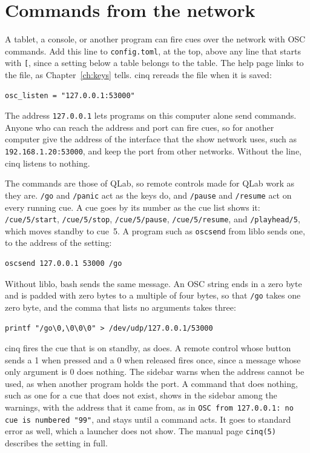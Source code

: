 \section{Commands from the network}

A tablet, a console, or another program can fire cues over the network with
OSC commands.  Add this line to \texttt{config.toml}, at the top, above any
line that starts with \texttt{[}, since a setting below a table belongs to the
table.  The help page links to the file, as Chapter~\ref{ch:keys} tells.  cinq
rereads the file when it is saved:

\begin{verbatim}
osc_listen = "127.0.0.1:53000"
\end{verbatim}

The address \texttt{127.0.0.1} lets programs on this computer alone send
commands.  Anyone who can reach the address and port can fire cues, so for
another computer give the address of the interface that the show network
uses, such as \texttt{192.168.1.20:53000}, and keep the port from other
networks.  Without the line, cinq listens to nothing.

The commands are those of QLab, so remote controls made for QLab work as they
are.  \texttt{/go} and \texttt{/panic} act as the keys do, and \texttt{/pause}
and \texttt{/resume} act on every running cue.  A cue goes by its number as the
cue list shows it: \texttt{/cue/5/start}, \texttt{/cue/5/stop},
\texttt{/cue/5/pause}, \texttt{/cue/5/resume}, and \texttt{/playhead/5}, which
moves standby to cue~5.  A program such as \texttt{oscsend} from liblo sends
one, to the address of the setting:

\begin{verbatim}
oscsend 127.0.0.1 53000 /go
\end{verbatim}

Without liblo, bash sends the same message.  An OSC string ends in a zero byte
and is padded with zero bytes to a multiple of four bytes, so that \texttt{/go}
takes one zero byte, and the comma that lists no arguments takes three:

\begin{verbatim}
printf "/go\0,\0\0\0" > /dev/udp/127.0.0.1/53000
\end{verbatim}

cinq fires the cue that is on standby, as  does.  A remote control
whose button sends a 1 when pressed and a 0 when released fires once, since a
message whose only argument is 0 does nothing.  The sidebar warns when the
address cannot be used, as when another program holds the port.  A command
that does nothing, such as one for a cue that does not exist, shows in the
sidebar among the warnings, with the address that it came from, as in
\texttt{OSC from 127.0.0.1: no cue is numbered "99"}, and stays until a
command acts.  It goes to standard error as well, which a launcher does not
show.  The manual page \texttt{cinq(5)} describes the setting in full.

